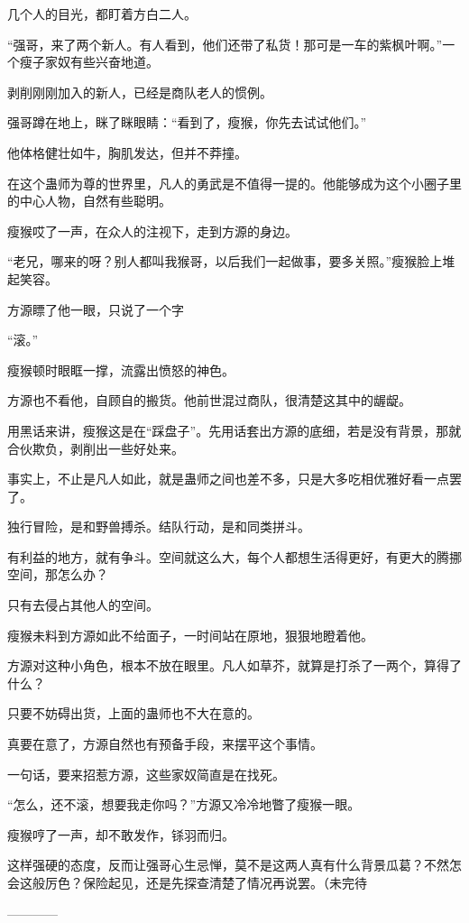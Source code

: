 \begin{this_body}
几个人的目光，都盯着方白二人。

“强哥，来了两个新人。有人看到，他们还带了私货！那可是一车的紫枫叶啊。”一个瘦子家奴有些兴奋地道。

剥削刚刚加入的新人，已经是商队老人的惯例。

强哥蹲在地上，眯了眯眼睛：“看到了，瘦猴，你先去试试他们。”

他体格健壮如牛，胸肌发达，但并不莽撞。

在这个蛊师为尊的世界里，凡人的勇武是不值得一提的。他能够成为这个小圈子里的中心人物，自然有些聪明。

瘦猴哎了一声，在众人的注视下，走到方源的身边。

“老兄，哪来的呀？别人都叫我猴哥，以后我们一起做事，要多关照。”瘦猴脸上堆起笑容。

方源瞟了他一眼，只说了一个字

“滚。”

瘦猴顿时眼眶一撑，流露出愤怒的神色。

方源也不看他，自顾自的搬货。他前世混过商队，很清楚这其中的龌龊。

用黑话来讲，瘦猴这是在“踩盘子”。先用话套出方源的底细，若是没有背景，那就合伙欺负，剥削出一些好处来。

事实上，不止是凡人如此，就是蛊师之间也差不多，只是大多吃相优雅好看一点罢了。

独行冒险，是和野兽搏杀。结队行动，是和同类拼斗。

有利益的地方，就有争斗。空间就这么大，每个人都想生活得更好，有更大的腾挪空间，那怎么办？

只有去侵占其他人的空间。

瘦猴未料到方源如此不给面子，一时间站在原地，狠狠地瞪着他。

方源对这种小角色，根本不放在眼里。凡人如草芥，就算是打杀了一两个，算得了什么？

只要不妨碍出货，上面的蛊师也不大在意的。

真要在意了，方源自然也有预备手段，来摆平这个事情。

一句话，要来招惹方源，这些家奴简直是在找死。

“怎么，还不滚，想要我走你吗？”方源又冷冷地瞥了瘦猴一眼。

瘦猴哼了一声，却不敢发作，铩羽而归。

这样强硬的态度，反而让强哥心生忌惮，莫不是这两人真有什么背景瓜葛？不然怎会这般厉色？保险起见，还是先探查清楚了情况再说罢。（未完待

------------

\end{this_body}

